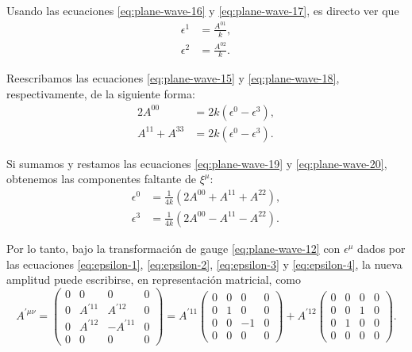 \documentclass[letterpaper,11pt]{article}
\begin{document}
Usando las ecuaciones \eqref{eq:plane-wave-16} y \eqref{eq:plane-wave-17}, es directo ver que
\begin{align}
\epsilon^1 &= \frac{A^{01}}{k}, \label{eq:epsilon-1}\\
\epsilon^2 &= \frac{A^{02}}{k}. \label{eq:epsilon-2}
\end{align}

Reescribamos las ecuaciones \eqref{eq:plane-wave-15} y \eqref{eq:plane-wave-18}, respectivamente, de la siguiente forma:
\begin{align}
2 A^{00} &= 2k(\epsilon^0 - \epsilon^3), \label{eq:plane-wave-19}\\
A^{11} + A^{33} &= 2k(\epsilon^0 - \epsilon^3). \label{eq:plane-wave-20}
\end{align}

Si sumamos y restamos las ecuaciones \eqref{eq:plane-wave-19} y \eqref{eq:plane-wave-20}, obtenemos las componentes faltante de $\xi^{\mu}$:
\begin{align}
\epsilon^0 &= \frac{1}{4k} \left( 2A^{00} + A^{11} + A^{22}\right), \label{eq:epsilon-3} \\
\epsilon^3 &= \frac{1}{4k} \left( 2A^{00} - A^{11} - A^{22}\right). \label{eq:epsilon-4}
\end{align}

Por lo tanto, bajo la transformación de gauge \eqref{eq:plane-wave-12} con $\epsilon^{\mu}$ dados por las ecuaciones \eqref{eq:epsilon-1}, \eqref{eq:epsilon-2}, \eqref{eq:epsilon-3} y \eqref{eq:epsilon-4}, la nueva amplitud puede escribirse, en representación matricial, como
\begin{equation}
A^{'\mu\nu} = \begin{pmatrix}
0 & 0 & 0 & 0 \\
0 & A^{'11} & A^{'12} & 0 \\
0 & A^{'12} & -A^{'11} & 0 \\
0 & 0 & 0 & 0 
\end{pmatrix} = A^{'11} \begin{pmatrix}
0 & 0 & 0 & 0 \\
0 & 1 & 0 & 0 \\
0 & 0 & -1 & 0 \\
0 & 0 & 0 & 0 
\end{pmatrix} + A^{'12} \begin{pmatrix}
0 & 0 & 0 & 0 \\
0 & 0 & 1 & 0 \\
0 & 1 & 0 & 0 \\
0 & 0 & 0 & 0 
\end{pmatrix} .
\end{equation}
\end{document}
